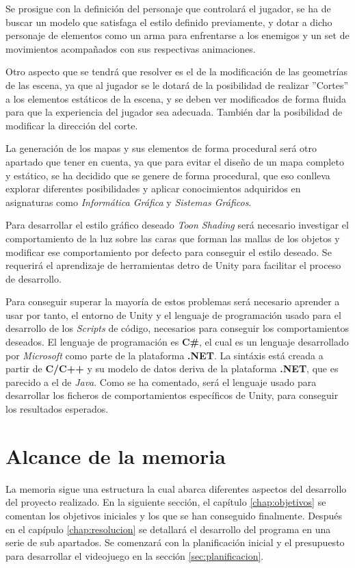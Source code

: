 Se prosigue con la definición del personaje que controlará el jugador, se ha de buscar un modelo que satisfaga el estilo definido previamente, y dotar a dicho personaje de elementos como un arma para enfrentarse a los enemigos y un set de movimientos acompañados con sus respectivas animaciones.

Otro aspecto que se tendrá que resolver es el de la modificación de las geometrías de las escena, ya que al jugador se le dotará de la posibilidad de realizar ''Cortes'' a los elementos estáticos de la escena, y se deben ver modificados de forma fluida para que la experiencia del jugador sea adecuada. También dar la posibilidad de modificar la dirección del corte.

La generación de los mapas y sus elementos de forma procedural será otro apartado que tener en cuenta, ya que para evitar el diseño de un mapa completo y estático, se ha decidido que se genere de forma procedural, que eso conlleva explorar diferentes posibilidades y aplicar conocimientos adquiridos en asignaturas como \textit{Informática Gráfica} y \textit{Sistemas Gráficos}.

Para desarrollar el estilo gráfico deseado \textit{Toon Shading} será necesario investigar el comportamiento de la luz sobre las caras que forman las mallas de los objetos y modificar ese comportamiento por defecto para conseguir el estilo deseado. Se requerirá el aprendizaje de herramientas detro de Unity para facilitar el proceso de desarrollo.

Para conseguir superar la mayoría de estos problemas será necesario aprender a usar por tanto, el entorno de Unity y el lenguaje de programación usado para el desarrollo de los \textit{Scripts} de código, necesarios para conseguir los comportamientos deseados. El lenguaje de programación es \textbf{C\#}, el cual es un lenguaje desarrollado por \textit{Microsoft} como parte de la plataforma \textbf{.NET}. La sintáxis está creada a partir de \textbf{C/C++} y su modelo de datos deriva de la plataforma \textbf{.NET}, que es parecido a el de \textit{Java}. Como se ha comentado, será el lenguaje usado para desarrollar los ficheros de comportamientos específicos de Unity, para conseguir los resultados esperados.

\section{Alcance de la memoria}

La memoria sigue una estructura la cual abarca diferentes aspectos del desarrollo del proyecto realizado. En la siguiente sección, el capítulo \ref{chap:objetivos} se comentan los objetivos iniciales y los que se han conseguido finalmente. Después en el capípulo \ref{chap:resolucion} se detallará el desarrollo del programa en una serie de sub apartados. Se comenzará con la planificación inicial y el presupuesto para desarrollar el videojuego en la sección \ref{sec:planificacion}. 

